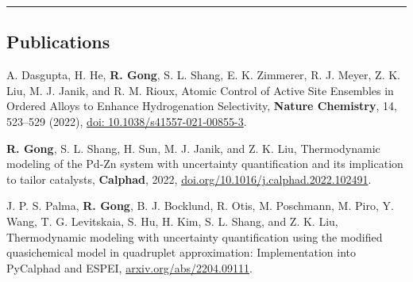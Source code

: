 \documentclass[10pt,letterpaper]{article}
\begin{document}
\hrule
\vspace{-0.6em}
\subsection*{Publications}

\begin{etaremune}
  \item  A. Dasgupta, H. He, \textbf{R. Gong}, S. L. Shang, E. K. Zimmerer, R. J. Meyer, Z. K. Liu, M. J. Janik, and R. M. Rioux,
  Atomic Control of Active Site Ensembles in Ordered Alloys to Enhance Hydrogenation Selectivity, 
  \textbf{Nature Chemistry}, 14, 523–529 (2022), \href{https://doi.org/10.1038/s41557-021-00855-3}{doi: 10.1038/s41557-021-00855-3}.
   \item \textbf{R. Gong}, S. L. Shang, H. Sun, M. J. Janik, and Z. K. Liu,
  Thermodynamic modeling of the Pd-Zn system with uncertainty quantification and its implication to tailor catalysts, 
  \textbf{Calphad}, 2022, \href{https://doi.org/10.1016/j.calphad.2022.102491}{doi.org/10.1016/j.calphad.2022.102491}.
  \item J. P. S. Palma, \textbf{R. Gong}, B. J. Bocklund, R. Otis, M. Poschmann, M. Piro, Y. Wang, T. G. Levitskaia, S. Hu, H. Kim, S. L. Shang, and Z. K. Liu, 
  Thermodynamic modeling with uncertainty quantification using the modified quasichemical model in quadruplet approximation: Implementation into PyCalphad and ESPEI,  \href{http://arxiv.org/abs/2204.09111}{arxiv.org/abs/2204.09111}.
\end{etaremune}
\end{document}
